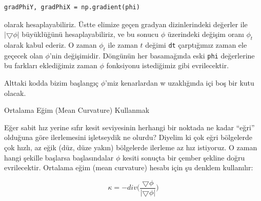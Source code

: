\documentclass[12pt,fleqn]{article}\usepackage{../../common}
\begin{document}
\begin{verbatim}
gradPhiY, gradPhiX = np.gradient(phi)
\end{verbatim}

olarak hesaplayabiliriz. Üstte elimize geçen gradyan dizinlerindeki
değerler ile $|\bigtriangledown\phi|$ büyüklüğünü hesaplayabiliriz, ve bu
sonucu $\phi$ üzerindeki değişim oranı $\phi_t$ olarak kabul ederiz. O
zaman $\phi_t$ ile zaman $t$ değimi \verb!dt! çarptığımız zaman ele geçecek
olan $\phi$'nin değişimidir. Döngünün her basamağında eski \verb!phi!
değerlerine bu farkları eklediğimiz zaman $\phi$ fonksiyonu istediğimiz
gibi evrilecektir.

Alttaki kodda bizim başlangıç $\phi$'miz kenarlardan w uzaklığında içi boş
bir kutu olacak. 

Ortalama Eğim (Mean Curvature) Kullanmak

Eğer sabit hız yerine sıfır kesit seviyesinin herhangi bir noktada ne kadar
``eğri'' olduğuna göre ilerlemesini işletseydik ne olurdu?  Diyelim ki çok
eğri bölgelerde çok hızlı, az eğik (düz, düze yakın) bölgelerde ilerleme az
hız istiyoruz. O zaman hangi şekille başlarsa başlasındalar $\phi$ kesiti
sonuçta bir çember şekline doğru evrilecektir. Ortalama eğim (mean
curvature) hesabı için şu denklem kullanılır:

$$ \kappa = -div \bigg( \frac{\bigtriangledown \phi}
{|\bigtriangledown \phi| } \bigg) $$
\end{document}
